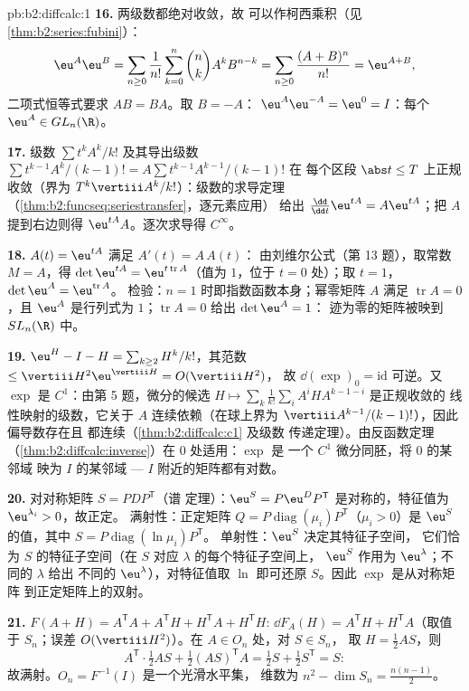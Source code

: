 \begin{solution}{pb:b2:diffcalc:1}
\textbf{16.} 两级数都绝对收敛，故
可以作柯西乘积（见\cref{thm:b2:series:fubini}）：
\[
\eu^A\eu^B = \sum_{n\geq0}\frac{1}{n!}\sum_{k=0}^n\binom
nkA^kB^{n-k}
= \sum_{n\geq0}\frac{(A+B)^n}{n!} = \eu^{A+B},
\]
二项式恒等式要求 $AB = BA$。取 $B = -A$：
$\eu^A\eu^{-A} = \eu^0 = I$：每个 $\eu^A \in GL_n(\R)$。

\textbf{17.} 级数 $\sum t^kA^k/k!$ 及其导出级数
$\sum t^{k-1}A^k/(k-1)! = A\sum t^{k-1}A^{k-1}/(k-1)!$ 在
每个区段 $\abs t \leq T$ 上正规收敛（界为
$T^k\vertiii A^k/k!$）：级数的求导定理
（\cref{thm:b2:funcseq:seriestransfer}，逐元素应用）
给出 $\frac{\dd}{\dd t}\eu^{tA} = A\eu^{tA}$；把 $A$
提到右边则得 $\eu^{tA}A$。逐次求导得 $C^\infty$。

\textbf{18.} $A(t) = \eu^{tA}$ 满足 $A'(t) = A\,A(t)$：
由刘维尔公式（第 13 题），取常数 $M = A$，得
$\det\eu^{tA} = \eu^{t\operatorname{tr}A}$（值为 $1$，位于 $t =
0$ 处）；取 $t = 1$，$\det\eu^A = \eu^{\operatorname{tr}A}$。
检验：$n = 1$ 时即指数函数本身；幂零矩阵 $A$ 满足
$\operatorname{tr}A = 0$，且 $\eu^A$ 是行列式为
$1$；$\operatorname{tr}A = 0$ 给出 $\det\eu^A = 1$：
迹为零的矩阵被映到 $SL_n(\R)$ 中。

\textbf{19.} $\eu^H - I - H = \sum_{k\geq2}H^k/k!$，其范数
$\leq \vertiii H^2\eu^{\vertiii H} = O(\vertiii H^2)$，
故 $\dd(\exp)_0 = \mathrm{id}$ 可逆。又 $\exp$ 是
$C^1$：由第 5 题，微分的候选 $H \mapsto
\sum_k\frac1{k!}\sum_iA^iHA^{k-1-i}$ 是正规收敛的
线性映射的级数，它关于 $A$ 连续依赖（在球上界为
$\vertiii A^{k-1}/(k-1)!$），因此偏导数存在且
都连续（\cref{thm:b2:diffcalc:c1} 及级数
传递定理）。由反函数定理
（\cref{thm:b2:diffcalc:inverse}）在 $0$ 处适用：$\exp$ 是
一个 $C^1$ 微分同胚，将 $0$ 的某邻域
映为 $I$ 的某邻域 --- $I$ 附近的矩阵都有对数。

\textbf{20.} 对对称矩阵 $S = PDP^{\mathsf T}$（谱
定理）：$\eu^S = P\eu^DP^{\mathsf T}$ 是对称的，特征值为
$\eu^{\lambda_i} > 0$，故正定。
满射性：正定矩阵 $Q =
P\operatorname{diag}(\mu_i)P^{\mathsf T}$（$\mu_i > 0$）是
$\eu^S$ 的值，其中 $S = P\operatorname{diag}(\ln\mu_i)P^{\mathsf T}$。
单射性：$\eu^S$ 决定其特征子空间，
它们恰为 $S$ 的特征子空间（在 $S$ 对应 $\lambda$ 的每个特征子空间上，
$\eu^S$ 作用为 $\eu^\lambda$；不同的 $\lambda$ 给出
不同的 $\eu^\lambda$），对特征值取 $\ln$
即可还原 $S$。因此 $\exp$ 是从对称矩阵
到正定矩阵上的双射。

\textbf{21.} $F(A + H) = A^{\mathsf T}A + A^{\mathsf T}H +
H^{\mathsf T}A + H^{\mathsf T}H$: $\dd F_A(H) =
A^{\mathsf T}H + H^{\mathsf T}A$（取值于 $S_n$；误差
$O(\vertiii H^2)$）。在 $A \in O_n$ 处，对 $S \in S_n$，
取 $H = \frac12AS$，则
\[
A^{\mathsf T}\cdot\tfrac12AS + \tfrac12(AS)^{\mathsf T}A
= \tfrac12 S + \tfrac12 S^{\mathsf T} = S :
\]
故满射。$O_n = F^{-1}(I)$ 是一个光滑水平集，
维数为 $n^2 - \dim S_n = \frac{n(n-1)}2$。


\end{solution}
